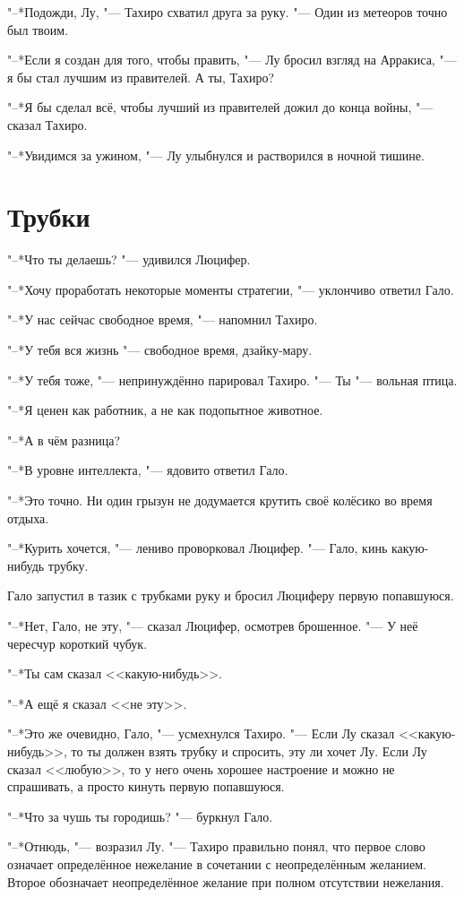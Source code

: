 \documentclass[a4paper,10pt,fleqn]{book}
\begin{document}
"--*Подожди, Лу, "--- Тахиро схватил друга за руку.
"--- Один из метеоров точно был твоим.

"--*Если я создан для того, чтобы править, "--- Лу бросил взгляд на Арракиса, "--- я бы стал лучшим из правителей.
А ты, Тахиро?

"--*Я бы сделал всё, чтобы лучший из правителей дожил до конца войны, "--- сказал Тахиро.

"--*Увидимся за ужином, "--- Лу улыбнулся и растворился в ночной тишине.

\section{Трубки}

"--*Что ты делаешь? "--- удивился Люцифер.

"--*Хочу проработать некоторые моменты стратегии, "--- уклончиво ответил Гало.

"--*У нас сейчас свободное время, "--- напомнил Тахиро.

"--*У тебя вся жизнь "--- свободное время, дзайку-мару.

"--*У тебя тоже, "--- непринуждённо парировал Тахиро.
"--- Ты "--- вольная птица.

"--*Я ценен как работник, а не как подопытное животное.

"--*А в чём разница?

"--*В уровне интеллекта, "--- ядовито ответил Гало.

"--*Это точно.
Ни один грызун не додумается крутить своё колёсико во время отдыха.

"--*Курить хочется, "--- лениво проворковал Люцифер.
"--- Гало, кинь какую-нибудь трубку.

Гало запустил в тазик с трубками руку и бросил Люциферу первую попавшуюся.

"--*Нет, Гало, не эту, "--- сказал Люцифер, осмотрев брошенное.
"--- У неё чересчур короткий чубук.

"--*Ты сам сказал <<какую-нибудь>>.

"--*А ещё я сказал <<не эту>>.

"--*Это же очевидно, Гало, "--- усмехнулся Тахиро.
"--- Если Лу сказал <<какую-нибудь>>, то ты должен взять трубку и спросить, эту ли хочет Лу.
Если Лу сказал <<любую>>, то у него очень хорошее настроение и можно не спрашивать, а просто кинуть первую попавшуюся.

"--*Что за чушь ты городишь? "--- буркнул Гало.

"--*Отнюдь, "--- возразил Лу.
"--- Тахиро правильно понял, что первое слово означает определённое нежелание в сочетании с неопределённым желанием.
Второе обозначает неопределённое желание при полном отсутствии нежелания.
\end{document}
